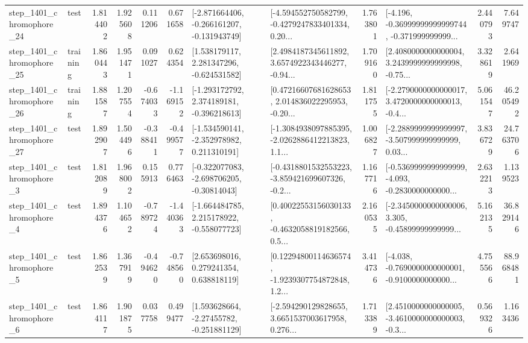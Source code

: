 \begin{tabular}{llrrrrllrlrr}
 step\_1401\_chromophore\_24 &      test &      1.814402 &    1.925608 &      0.111206 &  0.671658 &  [-2.871664406, -0.266161207, -0.131943749] &  [-4.594552750582799, -0.4279247833401334, 0.20... &       1.763801 &  [-4.196, -0.36999999999999744, -0.371999999999... &            2.440793 &          7.649747 \\
 step\_1401\_chromophore\_25 &  training &      1.860443 &    1.951471 &      0.091027 &  0.624354 &    [1.538179117, 2.281347296, -0.624531582] &  [2.4984187345611892, 3.6574922343446277, -0.94... &       1.709160 &  [2.4080000000000004, 3.2439999999999998, -0.75... &            3.328619 &          2.641969 \\
 step\_1401\_chromophore\_26 &  training &      1.881587 &    1.207554 &     -0.674033 & -1.169152 &   [-1.293172792, 2.374189181, -0.396218613] &  [0.47216607681628653, 2.014836022295953, -0.20... &       1.811755 &  [-2.2790000000000017, 3.4720000000000013, -0.4... &            5.061547 &         46.205492 \\
 step\_1401\_chromophore\_27 &      test &      1.892907 &    1.504496 &     -0.388411 & -0.499577 &   [-1.534590141, -2.352978982, 0.211310191] &  [-1.3084938097885395, -2.0262886412213823, 1.1... &       1.006827 &  [-2.2889999999999997, -3.507999999999999, 0.03... &            3.836729 &         24.763706 \\
  step\_1401\_chromophore\_3 &      test &      1.812089 &    1.968002 &      0.155913 &  0.776463 &   [-0.322077083, -2.698706205, -0.30814043] &  [-0.4318801532553223, -3.859421699607326, -0.2... &       1.167716 &  [-0.5369999999999999, -4.093, -0.2830000000000... &            2.632213 &          1.139523 \\
  step\_1401\_chromophore\_4 &      test &      1.894376 &    1.104652 &     -0.789724 & -1.440363 &   [-1.664484785, 2.215178922, -0.558077723] &  [0.40022553156030133, -0.4632058819182566, 0.5... &       2.160535 &  [-2.3450000000000006, 3.305, -0.45899999999999... &            5.162135 &         36.829146 \\
  step\_1401\_chromophore\_5 &      test &      1.862539 &    1.367919 &     -0.494620 & -0.748560 &     [2.653698016, 0.279241354, 0.638818119] &  [0.12294800114636574, -1.9239307754872848, 1.2... &       3.414736 &  [-4.038, -0.7690000000000001, -0.9100000000000... &            4.755566 &         88.968481 \\
  step\_1401\_chromophore\_6 &      test &      1.864117 &    1.901875 &      0.037758 &  0.499477 &    [1.593628664, -2.27455782, -0.251881129] &  [-2.594290129828655, 3.6651537003617958, 0.276... &       1.713389 &  [2.4510000000000005, -3.4610000000000003, -0.3... &            0.569326 &          1.163436 \\

\end{tabular}
